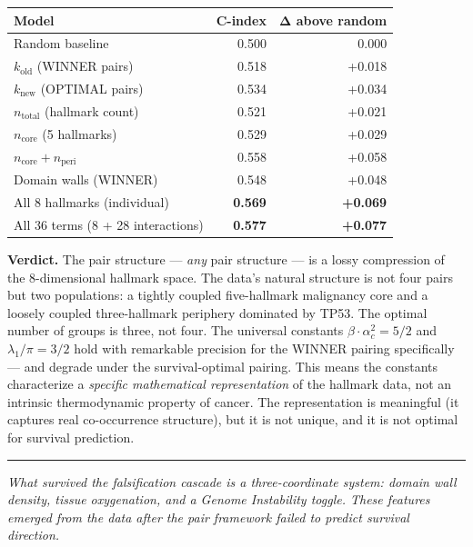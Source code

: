 \documentclass[
  11pt,
]{article}
\begin{document}
\begin{center}
\begin{tabular}{l r r}
\hline
\textbf{Model} & $\boldsymbol{C}$\textbf{-index} & $\boldsymbol{\Delta}$ \textbf{above random} \\
\hline
Random baseline & 0.500 & 0.000 \\
$k_\mathrm{old}$ (WINNER pairs) & 0.518 & +0.018 \\
$k_\mathrm{new}$ (OPTIMAL pairs) & 0.534 & +0.034 \\
$n_\mathrm{total}$ (hallmark count) & 0.521 & +0.021 \\
$n_\mathrm{core}$ (5 hallmarks) & 0.529 & +0.029 \\
$n_\mathrm{core} + n_\mathrm{peri}$ & 0.558 & +0.058 \\
Domain walls (WINNER) & 0.548 & +0.048 \\
All 8 hallmarks (individual) & \textbf{0.569} & \textbf{+0.069} \\
All 36 terms (8 + 28 interactions) & \textbf{0.577} & \textbf{+0.077} \\
\hline
\end{tabular}
\end{center}

\textbf{Verdict.} The pair structure --- \emph{any} pair structure ---
is a lossy compression of the 8-dimensional hallmark space. The data's
natural structure is not four pairs but two populations: a tightly
coupled five-hallmark malignancy core and a loosely coupled
three-hallmark periphery dominated by TP53. The optimal number of groups
is three, not four. The universal constants
\(\beta \cdot \alpha_c^2 = 5/2\) and \(\lambda_1/\pi = 3/2\) hold with
remarkable precision for the WINNER pairing specifically --- and degrade
under the survival-optimal pairing. This means the constants
characterize a \emph{specific mathematical representation} of the
hallmark data, not an intrinsic thermodynamic property of cancer. The
representation is meaningful (it captures real co-occurrence structure),
but it is not unique, and it is not optimal for survival prediction.

\begin{center}\rule{0.5\linewidth}{0.5pt}\end{center}

\emph{What survived the falsification cascade is a three-coordinate
system: domain wall density, tissue oxygenation, and a Genome
Instability toggle. These features emerged from the data after the pair
framework failed to predict survival direction.}
\end{document}
